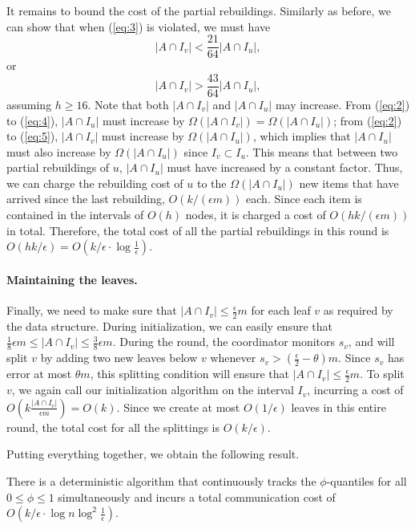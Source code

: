 \documentclass[10pt]{article}
\newcommand{\eps}{\epsilon}
\begin{document}
It remains to bound the cost of the partial rebuildings.  Similarly as
before, we can show that when (\ref{eq:3}) is violated, we must have
\begin{equation}
  \label{eq:4}
|A \cap I_v| < \frac{21}{64}|A\cap I_u|,
\end{equation}
or
\begin{equation}
\label{eq:5}
   |A \cap I_v| > \frac{43}{64}|A\cap I_u|,
\end{equation}
assuming $h \ge 16$.  Note that both $|A\cap I_v|$ and $|A\cap I_u|$ may
increase.  From (\ref{eq:2}) to (\ref{eq:4}), $|A \cap I_u|$ must increase
by $\Omega(|A\cap I_v|) = \Omega(|A\cap I_u|)$; from (\ref{eq:2}) to
(\ref{eq:5}), $|A\cap I_v|$ must increase by $\Omega(|A \cap I_u|)$, which
implies that $|A\cap I_u|$ must also increase by $\Omega(|A \cap I_u|)$
since $I_v \subset I_u$.  This means that between two partial rebuildings
of $u$, $|A \cap I_u|$ must have increased by a constant factor.  Thus, we
can charge the rebuilding cost of $u$ to the $\Omega(|A \cap I_u|)$ new
items that have arrived since the last rebuilding,  $O(k/(\eps m))$ each.
Since each item is contained in the intervals of $O(h)$ nodes, it is
charged a cost of $O(hk/(\eps m))$ in total.  Therefore, the total cost of
all the partial rebuildings in this round is $O(hk/\eps) = O(k/\eps \cdot
\log\frac{1}{\eps})$.

\paragraph{Maintaining the leaves.}
Finally, we need to make sure that $|A\cap I_v| \le \frac{\eps}{2} m$ for
each leaf $v$ as required by the data structure.  During initialization, we
can easily ensure that $\frac{1}{8} \eps m \le |A\cap I_v| \le
\frac{3}{8}\eps m$.  During the round, the coordinator monitors $s_v$, and
will split $v$ by adding two new leaves below $v$ whenever $s_v >
(\frac{\eps}{2}-\theta)m$.  Since $s_v$ has error at most $\theta m$, this
splitting condition will ensure that $|A\cap I_v| \le \frac{\eps}{2} m$.
To split $v$, we again call our initialization algorithm on the interval
$I_v$, incurring a cost of $O(k\frac{|A\cap I_v|}{\eps m}) = O(k)$.  Since
we create at most $O(1/\eps)$ leaves in this entire round, the total cost
for all the splittings is $O(k/\eps)$.

\smallskip Putting everything together, we obtain the following result.

\begin{theorem}
  There is a deterministic algorithm that continuously tracks the
  $\phi$-quantiles for all $0\le \phi \le 1$ simultaneously and incurs a
  total communication cost of
  $O(k/\eps\cdot \log n \log^2\frac{1}{\eps})$.
\end{theorem}
\end{document}
